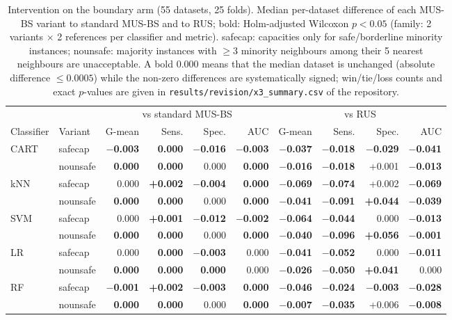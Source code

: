 \begin{table}[htbp]
\centering\footnotesize
\setlength{\tabcolsep}{3.5pt}
\caption{Intervention on the boundary arm (55 datasets, 25 folds). Median per-dataset difference of each MUS-BS variant to standard MUS-BS and to RUS; bold: Holm-adjusted Wilcoxon $p<0.05$ (family: 2 variants $\times$ 2 references per classifier and metric). safecap: capacities only for safe/borderline minority instances; nounsafe: majority instances with $\geq 3$ minority neighbours among their 5 nearest neighbours are unacceptable. A bold 0.000 means that the median dataset is unchanged (absolute difference $\leq 0.0005$) while the non-zero differences are systematically signed; win/tie/loss counts and exact $p$-values are given in \texttt{results/revision/x3\_summary.csv} of the repository.}
\label{tab:x3}
\begin{tabular}{llrrrrrrrr}
\toprule
 & & \multicolumn{4}{c}{vs standard MUS-BS} & \multicolumn{4}{c}{vs RUS}\\
\cmidrule(lr){3-6}\cmidrule(lr){7-10}
Classifier & Variant & G-mean & Sens. & Spec. & AUC & G-mean & Sens. & Spec. & AUC\\
\midrule
CART & safecap & \textbf{$-$0.003} & \textbf{0.000} & \textbf{$-$0.016} & \textbf{$-$0.003} & \textbf{$-$0.037} & \textbf{$-$0.018} & \textbf{$-$0.029} & \textbf{$-$0.041}\\
 & nounsafe & \textbf{0.000} & \textbf{0.000} & 0.000 & \textbf{0.000} & \textbf{$-$0.016} & \textbf{$-$0.018} & +0.001 & \textbf{$-$0.013}\\
kNN & safecap & 0.000 & \textbf{+0.002} & \textbf{$-$0.004} & \textbf{0.000} & \textbf{$-$0.069} & \textbf{$-$0.074} & +0.002 & \textbf{$-$0.069}\\
 & nounsafe & \textbf{0.000} & \textbf{0.000} & 0.000 & \textbf{0.000} & \textbf{$-$0.041} & \textbf{$-$0.091} & \textbf{+0.044} & \textbf{$-$0.039}\\
SVM & safecap & 0.000 & \textbf{+0.001} & \textbf{$-$0.012} & \textbf{$-$0.002} & \textbf{$-$0.064} & \textbf{$-$0.044} & 0.000 & \textbf{$-$0.013}\\
 & nounsafe & \textbf{0.000} & \textbf{0.000} & 0.000 & \textbf{0.000} & \textbf{$-$0.040} & \textbf{$-$0.096} & \textbf{+0.056} & \textbf{$-$0.001}\\
LR & safecap & 0.000 & \textbf{0.000} & \textbf{$-$0.003} & 0.000 & \textbf{$-$0.041} & \textbf{$-$0.052} & 0.000 & \textbf{$-$0.011}\\
 & nounsafe & \textbf{0.000} & \textbf{0.000} & \textbf{0.000} & 0.000 & \textbf{$-$0.026} & \textbf{$-$0.050} & \textbf{+0.041} & 0.000\\
RF & safecap & \textbf{$-$0.001} & \textbf{+0.002} & \textbf{$-$0.003} & \textbf{0.000} & \textbf{$-$0.046} & \textbf{$-$0.024} & \textbf{$-$0.003} & \textbf{$-$0.028}\\
 & nounsafe & \textbf{0.000} & \textbf{0.000} & 0.000 & \textbf{0.000} & \textbf{$-$0.007} & \textbf{$-$0.035} & +0.006 & \textbf{$-$0.008}\\
\bottomrule
\end{tabular}
\end{table}
